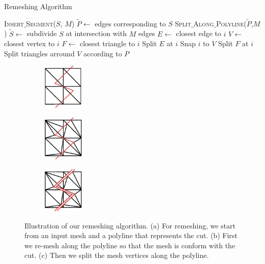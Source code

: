 \documentclass[11pt, oneside, a4paper]{memoir}
\begin{document}
\begin{algorithm}[hp]
\caption{\label{alg:remeshing}Remeshing Algorithm}
\begin{algorithmic}[1]
\State \textsc{Insert$\_$Segment}($S$, $M$)
\State $\tilde{P} \gets$ edges corresponding to $S$
\State \textsc{Split$\_$Along$\_$Polyline}($\tilde{P}$,$M$)
\EndProcedure
\State
{}
\State $\tilde{S} \gets$ subdivide $S$ at intersection with $M$ edges
\State $E \gets$ closest edge to $i$
\State $V \gets$ closest vertex to $i$
\State $F \gets$ closest triangle to $i$
\State Split $E$ at $i$
\State Snap $i$ to $V$
\Else
\State Split $F$ at $i$
\EndIf
\EndFor
\EndProcedure
\State
{}
\State Split triangles arround $V$ according to $P$
\EndFor
\EndProcedure
\end{algorithmic}
\end{algorithm}

\begin{figure}[p]
\centering
\begin{subfigure}[c]{0.3\linewidth}
\centering
\includegraphics[height=2.2cm]{images/cutting-mig2015/remeshing_1.pdf}
\caption{\label{fig:remeshing1}}
\end{subfigure}
\hfill
\begin{subfigure}[c]{0.3\linewidth}
\centering
\includegraphics[height=2.2cm]{images/cutting-mig2015/remeshing_2.pdf}
\caption{\label{fig:remeshing2}}
\end{subfigure}
\hfill
\begin{subfigure}[c]{0.3\linewidth}
\centering
\includegraphics[height=2.2cm]{images/cutting-mig2015/remeshing_3.pdf}
\caption{\label{fig:remeshing3}}
\end{subfigure}
\caption{\label{fig:remeshing} Illustration of our remeshing algorithm. (a) For remeshing, we start from an input mesh and a polyline that represents the cut. (b) First we re-mesh along the polyline so that the mesh is conform with the cut. (c) Then we split the mesh vertices along the polyline.}
\end{figure}
\end{document}
